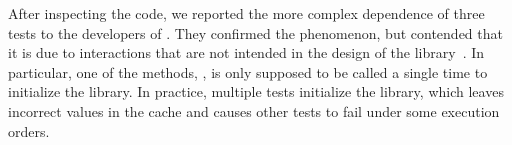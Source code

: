 
After inspecting the code, we reported the more complex dependence of
three tests to the developers of \jodatime. They confirmed the
phenomenon, but contended that it is due to interactions that are not
intended in the design of the library~\cite{jodatime}. In particular, one of the
methods, , is only supposed to be
called a single time to initialize the library.  In practice, multiple
tests initialize the library, which leaves incorrect values in the cache
and causes other tests to fail under some execution orders.
